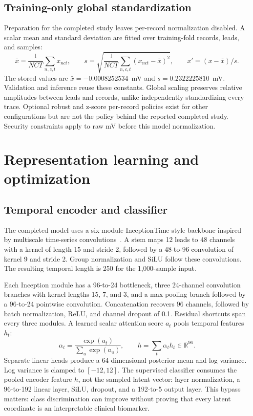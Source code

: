 \documentclass[11pt,a4paper]{article}
\begin{document}
\subsection{Training-only global standardization}
Preparation for the completed study leaves per-record normalization disabled. A scalar mean and standard deviation are fitted over training-fold records, leads, and samples:
\begin{equation}
\bar{x}=\frac{1}{NCT}\sum_{n,c,t}x_{nct},\qquad
s=\sqrt{\frac{1}{NCT}\sum_{n,c,t}(x_{nct}-\bar{x})^2},\qquad
x'=(x-\bar{x})/s.
\end{equation}
The stored values are $\bar{x}=-0.0008252534$~mV and $s=0.2322225810$~mV. Validation and inference reuse these constants. Global scaling preserves relative amplitudes between leads and records, unlike independently standardizing every trace. Optional robust and z-score per-record policies exist for other configurations but are not the policy behind the reported completed study. Security constraints apply to raw mV before this model normalization.

\section{Representation learning and optimization}
\label{sec:representation}
\subsection{Temporal encoder and classifier}
The completed model uses a six-module InceptionTime-style backbone inspired by multiscale time-series convolutions~\cite{inception}. A stem maps 12 leads to 48 channels with a kernel of length 15 and stride 2, followed by a 48-to-96 convolution of kernel 9 and stride 2. Group normalization and SiLU follow these convolutions. The resulting temporal length is 250 for the 1,000-sample input.

Each Inception module has a 96-to-24 bottleneck, three 24-channel convolution branches with kernel lengths 15, 7, and 3, and a max-pooling branch followed by a 96-to-24 pointwise convolution. Concatenation recovers 96 channels, followed by batch normalization, ReLU, and channel dropout of 0.1. Residual shortcuts span every three modules. A learned scalar attention score $a_t$ pools temporal features $h_t$:
\begin{equation}
\alpha_t=\frac{\exp(a_t)}{\sum_{u}\exp(a_u)},\qquad h=\sum_t\alpha_t h_t\in\mathbb{R}^{96}.
\end{equation}
Separate linear heads produce a 64-dimensional posterior mean and log variance. Log variance is clamped to $[-12,12]$. The supervised classifier consumes the pooled encoder feature $h$, not the sampled latent vector: layer normalization, a 96-to-192 linear layer, SiLU, dropout, and a 192-to-5 output layer. This bypass matters: class discrimination can improve without proving that every latent coordinate is an interpretable clinical biomarker.
\end{document}
